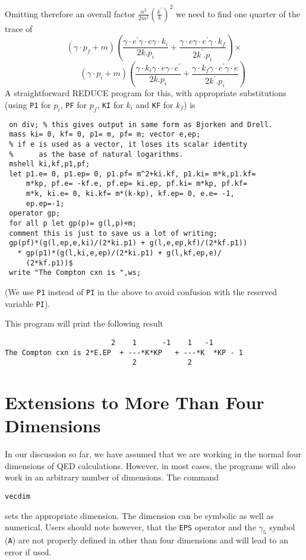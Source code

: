 Omitting therefore an overall factor
$\displaystyle\frac{\alpha^2}{2m^2}\left(\frac{k^\prime}{k}\right)^2$ we need to find one quarter of the trace of
\begin{displaymath}
 \left( \gamma\cdot p_f + m\right)
 \left(\frac{\gamma\cdot e^\prime \gamma\cdot e\gamma\cdot k_i}{2k.p_i} +
  \frac{\gamma\cdot e\gamma\cdot e^\prime \gamma\cdot k_f}{2k^\prime.p_i}\right)\times
\end{displaymath}
\begin{displaymath}
 \qquad\left(
  \gamma\cdot p_i + m\right)
 \left(\frac{\gamma\cdot k_i\gamma\cdot e\gamma\cdot e^\prime}{2k.p_i} +
  \frac{\gamma\cdot k_f\gamma\cdot e^\prime \gamma\cdot e}{2k^\prime.p_i}\right) 
\end{displaymath}
A straightforward REDUCE program for this, with appropriate substitutions
(using \texttt{P1} for $p_i$, \texttt{PF} for $p_f$, \texttt{KI}
for $k_i$ and \texttt{KF} for $k_f$) is
\begin{verbatim}
 on div; % this gives output in same form as Bjorken and Drell.
 mass ki= 0, kf= 0, p1= m, pf= m; vector e,ep;
 % if e is used as a vector, it loses its scalar identity
 %      as the base of natural logarithms.
 mshell ki,kf,p1,pf;
 let p1.e= 0, p1.ep= 0, p1.pf= m^2+ki.kf, p1.ki= m*k,p1.kf=
     m*kp, pf.e= -kf.e, pf.ep= ki.ep, pf.ki= m*kp, pf.kf=
     m*k, ki.e= 0, ki.kf= m*(k-kp), kf.ep= 0, e.e= -1,
     ep.ep=-1;
 operator gp;
 for all p let gp(p)= g(l,p)+m;
 comment this is just to save us a lot of writing;
 gp(pf)*(g(l,ep,e,ki)/(2*ki.p1) + g(l,e,ep,kf)/(2*kf.p1))
   * gp(p1)*(g(l,ki,e,ep)/(2*ki.p1) + g(l,kf,ep,e)/
     (2*kf.p1))$
 write "The Compton cxn is ",ws;
\end{verbatim}

(We use \texttt{P1} instead of \texttt{PI} in the above to avoid confusion with
the reserved variable \texttt{PI}).

This program will print the following result
\begin{verbatim}
                         2    1      -1    1   -1
The Compton cxn is 2*E.EP  + ---*K*KP   + ---*K  *KP - 1
                              2            2
\end{verbatim}

\section{Extensions to More Than Four Dimensions}
\hypertarget{command:VECDIM}{}

In our discussion so far, we have assumed that we are working in the
normal four dimensions of QED calculations. However, in most cases, the
programs will also work in an arbitrary number of dimensions. The command
\begin{syntax}
    \texttt{vecdim }
\end{syntax}
sets the appropriate dimension. The dimension can be symbolic as well as
numerical. Users should note however, that the \texttt{EPS} operator and the
$\gamma_{5}$ symbol (\texttt{A}) are not properly defined in other than four
dimensions and will lead to an error if used.

